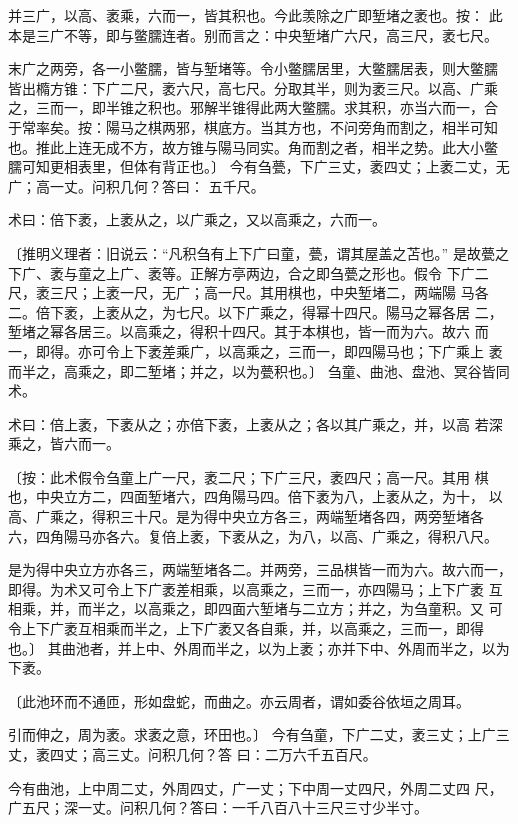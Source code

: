 \documentclass[a4paper,12pt,UTF8,twoside]{ctexbook}
\begin{document}
并三广，以高、袤乘，六而一，皆其积也。今此羡除之广即堑堵之袤也。按： 此本是三广不等，即与鳖臑连者。别而言之：中央堑堵广六尺，高三尺，袤七尺。

末广之两旁，各一小鳖臑，皆与堑堵等。令小鳖臑居里，大鳖臑居表，则大鳖臑 皆出橢方锥：下广二尺，袤六尺，高七尺。分取其半，则为袤三尺。以高、广乘 之，三而一，即半锥之积也。邪解半锥得此两大鳖臑。求其积，亦当六而一，合 于常率矣。按：陽马之棋两邪，棋底方。当其方也，不问旁角而割之，相半可知 也。推此上连无成不方，故方锥与陽马同实。角而割之者，相半之势。此大小鳖 臑可知更相表里，但体有背正也。〕 今有刍甍，下广三丈，袤四丈；上袤二丈，无广；高一丈。问积几何？答曰： 五千尺。

术曰：倍下袤，上袤从之，以广乘之，又以高乘之，六而一。

〔推明义理者：旧说云：“凡积刍有上下广曰童，甍，谓其屋盖之苫也。” 是故甍之下广、袤与童之上广、袤等。正解方亭两边，合之即刍甍之形也。假令 下广二尺，袤三尺；上袤一尺，无广；高一尺。其用棋也，中央堑堵二，两端陽 马各二。倍下袤，上袤从之，为七尺。以下广乘之，得幂十四尺。陽马之幂各居 二，堑堵之幂各居三。以高乘之，得积十四尺。其于本棋也，皆一而为六。故六 而一，即得。亦可令上下袤差乘广，以高乘之，三而一，即四陽马也；下广乘上 袤而半之，高乘之，即二堑堵；并之，以为甍积也。〕 刍童、曲池、盘池、冥谷皆同术。

术曰：倍上袤，下袤从之；亦倍下袤，上袤从之；各以其广乘之，并，以高 若深乘之，皆六而一。

〔按：此术假令刍童上广一尺，袤二尺；下广三尺，袤四尺；高一尺。其用 棋也，中央立方二，四面堑堵六，四角陽马四。倍下袤为八，上袤从之，为十， 以高、广乘之，得积三十尺。是为得中央立方各三，两端堑堵各四，两旁堑堵各 六，四角陽马亦各六。复倍上袤，下袤从之，为八，以高、广乘之，得积八尺。

是为得中央立方亦各三，两端堑堵各二。并两旁，三品棋皆一而为六。故六而一， 即得。为术又可令上下广袤差相乘，以高乘之，三而一，亦四陽马；上下广袤 互相乘，并，而半之，以高乘之，即四面六堑堵与二立方；并之，为刍童积。又 可令上下广袤互相乘而半之，上下广袤又各自乘，并，以高乘之，三而一，即得 也。〕 其曲池者，并上中、外周而半之，以为上袤；亦并下中、外周而半之，以为 下袤。

〔此池环而不通匝，形如盘蛇，而曲之。亦云周者，谓如委谷依垣之周耳。

引而伸之，周为袤。求袤之意，环田也。〕 今有刍童，下广二丈，袤三丈；上广三丈，袤四丈；高三丈。问积几何？答 曰：二万六千五百尺。

今有曲池，上中周二丈，外周四丈，广一丈；下中周一丈四尺，外周二丈四 尺，广五尺；深一丈。问积几何？答曰：一千八百八十三尺三寸少半寸。
\end{document}
